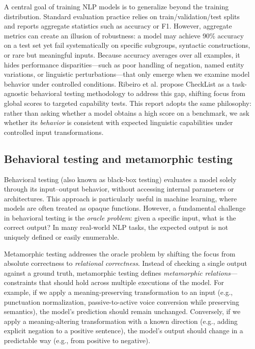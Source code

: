 \documentclass[11pt]{article}
\begin{document}
A central goal of training NLP models is to generalize beyond the training distribution. Standard evaluation practice relies on train/validation/test splits and reports aggregate statistics such as accuracy or F1. However, aggregate metrics can create an illusion of robustness: a model may achieve 90\% accuracy on a test set yet fail systematically on specific subgroups, syntactic constructions, or rare but meaningful inputs. Because accuracy averages over all examples, it hides performance disparities—such as poor handling of negation, named entity variations, or linguistic perturbations—that only emerge when we examine model behavior under controlled conditions. Ribeiro et al. propose CheckList as a task-agnostic behavioral testing methodology to address this gap, shifting focus from global scores to targeted capability tests. This report adopts the same philosophy: rather than asking whether a model obtains a high score on a benchmark, we ask whether its \emph{behavior} is consistent with expected linguistic capabilities under controlled input transformations.

\subsection{Behavioral testing and metamorphic testing}

Behavioral testing (also known as black-box testing) evaluates a model solely through its input--output behavior, without accessing internal parameters or architectures. This approach is particularly useful in machine learning, where models are often treated as opaque functions. However, a fundamental challenge in behavioral testing is the \textit{oracle problem}: given a specific input, what is the correct output? In many real-world NLP tasks, the expected output is not uniquely defined or easily enumerable.

Metamorphic testing addresses the oracle problem by shifting the focus from absolute correctness to \textit{relational correctness}. Instead of checking a single output against a ground truth, metamorphic testing defines \textit{metamorphic relations}—constraints that should hold across multiple executions of the model. For example, if we apply a meaning-preserving transformation to an input (e.g., punctuation normalization, passive-to-active voice conversion while preserving semantics), the model's prediction should remain unchanged. Conversely, if we apply a meaning-altering transformation with a known direction (e.g., adding explicit negation to a positive sentence), the model's output should change in a predictable way (e.g., from positive to negative).
\end{document}
